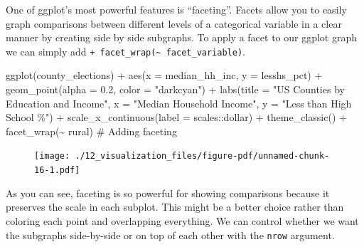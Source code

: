 \documentclass[
  letterpaper,
]{book}
\newenvironment{Shaded}{\begin{snugshade}}{\end{snugshade}}
\newcommand{\AttributeTok}[1]{\textcolor[rgb]{0.40,0.45,0.13}{#1}}
\newcommand{\CommentTok}[1]{\textcolor[rgb]{0.37,0.37,0.37}{#1}}
\newcommand{\FloatTok}[1]{\textcolor[rgb]{0.68,0.00,0.00}{#1}}
\newcommand{\FunctionTok}[1]{\textcolor[rgb]{0.28,0.35,0.67}{#1}}
\newcommand{\NormalTok}[1]{\textcolor[rgb]{0.00,0.23,0.31}{#1}}
\newcommand{\SpecialCharTok}[1]{\textcolor[rgb]{0.37,0.37,0.37}{#1}}
\newcommand{\StringTok}[1]{\textcolor[rgb]{0.13,0.47,0.30}{#1}}
\theoremstyle{definition}
\theoremstyle{definition}
\theoremstyle{plain}
\theoremstyle{definition}
\theoremstyle{plain}
\theoremstyle{plain}
\theoremstyle{remark}
\begin{document}
One of ggplot's most powerful features is ``faceting''. Facets allow you
to easily graph comparisons between different levels of a categorical
variable in a clear manner by creating side by side subgraphs. To apply
a facet to our ggplot graph we can simply add
\texttt{+\ facet\_wrap(\textasciitilde{}\ facet\_variable)}.

\begin{Shaded}
\begin{Highlighting}[]
\FunctionTok{ggplot}\NormalTok{(county\_elections) }\SpecialCharTok{+}
  \FunctionTok{aes}\NormalTok{(}\AttributeTok{x =}\NormalTok{ median\_hh\_inc, }\AttributeTok{y =}\NormalTok{ lesshs\_pct) }\SpecialCharTok{+}
  \FunctionTok{geom\_point}\NormalTok{(}\AttributeTok{alpha =} \FloatTok{0.2}\NormalTok{, }\AttributeTok{color =} \StringTok{"darkcyan"}\NormalTok{) }\SpecialCharTok{+}
  \FunctionTok{labs}\NormalTok{(}\AttributeTok{title =} \StringTok{"US Counties by Education and Income"}\NormalTok{,}
       \AttributeTok{x =} \StringTok{"Median Household Income"}\NormalTok{,}
       \AttributeTok{y =} \StringTok{"Less than High School \%"}\NormalTok{) }\SpecialCharTok{+}
  \FunctionTok{scale\_x\_continuous}\NormalTok{(}\AttributeTok{label =}\NormalTok{ scales}\SpecialCharTok{::}\NormalTok{dollar) }\SpecialCharTok{+}
  \FunctionTok{theme\_classic}\NormalTok{() }\SpecialCharTok{+}
  \FunctionTok{facet\_wrap}\NormalTok{(}\SpecialCharTok{\textasciitilde{}}\NormalTok{ rural) }\CommentTok{\# Adding faceting}
\end{Highlighting}
\end{Shaded}

\begin{figure}[H]

{\centering \texttt{[image: ./12\_visualization\_files/figure-pdf/unnamed-chunk-16-1.pdf]}

}

\end{figure}

As you can see, faceting is so powerful for showing comparisons because
it preserves the scale in each subplot. This might be a better choice
rather than coloring each point and overlapping everything. We can
control whether we want the subgraphs side-by-side or on top of each
other with the \texttt{nrow} argument.
\end{document}
